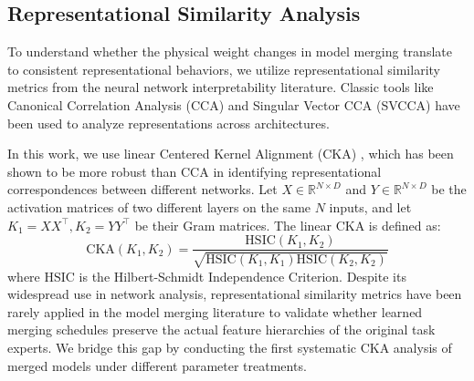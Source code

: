 \subsection{Representational Similarity Analysis}
To understand whether the physical weight changes in model merging translate to consistent representational behaviors, we utilize representational similarity metrics from the neural network interpretability literature. Classic tools like Canonical Correlation Analysis (CCA) \cite{morcos2018insights} and Singular Vector CCA (SVCCA) \cite{raghu2017svcca} have been used to analyze representations across architectures. 

In this work, we use linear Centered Kernel Alignment (CKA) \cite{kornblith2019similarity}, which has been shown to be more robust than CCA in identifying representational correspondences between different networks. Let $X \in \mathbb{R}^{N \times D}$ and $Y \in \mathbb{R}^{N \times D}$ be the activation matrices of two different layers on the same $N$ inputs, and let $K_1 = XX^\top, K_2 = YY^\top$ be their Gram matrices. The linear CKA is defined as:
\begin{equation}
    \text{CKA}(K_1, K_2) = \frac{\text{HSIC}(K_1, K_2)}{\sqrt{\text{HSIC}(K_1, K_1) \text{HSIC}(K_2, K_2)}}
\end{equation}
where $\text{HSIC}$ is the Hilbert-Schmidt Independence Criterion. Despite its widespread use in network analysis, representational similarity metrics have been rarely applied in the model merging literature to validate whether learned merging schedules preserve the actual feature hierarchies of the original task experts. We bridge this gap by conducting the first systematic CKA analysis of merged models under different parameter treatments.
